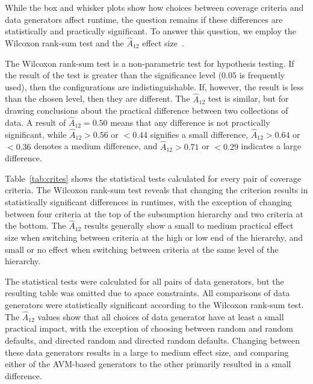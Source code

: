 
While the box and whisker plots show how choices between coverage criteria and data generators affect runtime, the
question remains if these differences are statistically and practically significant. To answer this question, we employ
the Wilcoxon rank-sum test and the $\hat{A}_{12}$ effect size~\cite{mcminn2015}.

The Wilcoxon rank-sum test is a non-parametric test for hypothesis testing.  If the result of the test is greater than
the significance level ($0.05$ is frequently used), then the configurations are indistinguishable.  If, however, the
result is less than the chosen level, then they are different.  The $\hat{A}_{12}$ test is similar, but for drawing
conclusions about the practical difference between two collections of data.  A result of $\hat{A}_{12}=0.50$ means that
any difference is not practically significant, while $\hat{A}_{12}>0.56$ or $<0.44$ signifies a small difference,
$\hat{A}_{12}>0.64$ or $<0.36$ denotes a medium difference, and $\hat{A}_{12}>0.71$ or $<0.29$ indicates a large
difference.

Table~\ref{tab:crites} shows the statistical tests calculated for every pair of coverage criteria. The Wilcoxon
rank-sum test reveals that changing the criterion results in statistically significant differences in runtimes, with the
exception of changing between four criteria at the top of the subsumption hierarchy and two criteria at the
bottom.  The $\hat{A}_{12}$ results generally show a small to medium practical effect size when switching between criteria at
the high or low end of the hierarchy, and small or no effect when switching between criteria at the same level of the
hierarchy.

The statistical tests were calculated for all pairs of data generators, but the resulting table was omitted due to space
constraints. All comparisons of data generators were statistically significant according to the Wilcoxon rank-sum test.
The $\hat{A}_{12}$ values show that all choices of data generator have at least a small practical impact, with the
exception of choosing between random and random defaults, and directed random and directed random defaults.  Changing
between these data generators results in a large to medium effect size, and comparing either of the AVM-based
generators to the other primarily resulted in a small difference.
